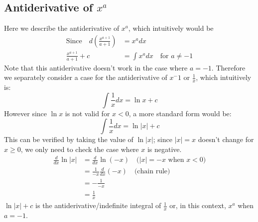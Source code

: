 \documentclass{report}
\begin{document}
\subsection{Antiderivative of $x^a$} %
Here we describe the antiderivative of $x^a$, which intuitively would be
\begin{align*}
\text{Since}\quad d(\frac{x^{a+1}}{a+1})&=x^adx\\
\frac{x^{a+1}}{a+1}+c&=\int x^adx\quad\text{for $a\neq -1$}
\end{align*}
Note that this antiderivative doesn't work in the case where $a=-1$. Therefore we 
separately consider a case for the antiderivative of $x^-1$ or $\frac{1}{x}$, which intuitively is:
\begin{equation*}
\int\frac{1}{x}dx=\ln x+c
\end{equation*}
However since $\ln x$ is not valid for $x<0$, a more standard form would be:
\begin{equation*}
\int\frac{1}{x}dx=\ln|x|+c
\end{equation*} 
This can be verified by taking the value of $\ln|x|$; since $|x|=x$ doesn't change for $x\geq0$,
we only need to check the case where $x$ is negative.
\begin{align*}
\frac{d}{dx}\ln|x|&=\frac{d}{dx}\ln(-x)\quad\text{$(|x|=-x$ when $x<0$)}\\
&=\frac{1}{-x}\frac{d}{dx}(-x)\quad\text{(chain rule)}\\
&=-\frac{1}{-x}\\
&=\frac{1}{x}
\end{align*}
$\ln|x|+c$ is the antiderivative/indefinite integral of $\frac{1}{x}$ or, in this context, $x^a$ when $a=-1$.
\newpage
\end{document}
